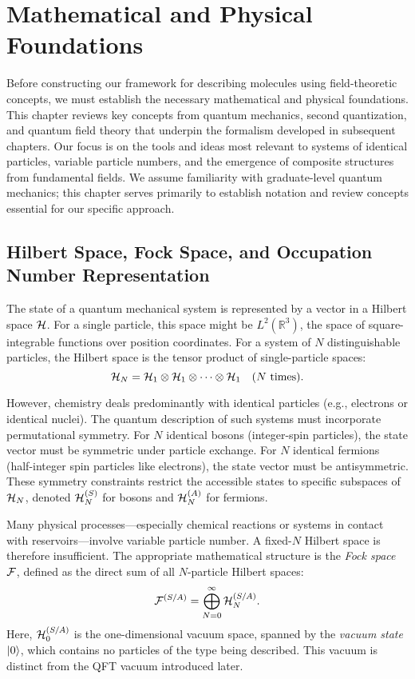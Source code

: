
\chapter{Mathematical and Physical Foundations}
\label{chap:foundations}

Before constructing our framework for describing molecules using field-theoretic concepts, we must establish the necessary mathematical and physical foundations. This chapter reviews key concepts from quantum mechanics, second quantization, and quantum field theory that underpin the formalism developed in subsequent chapters. Our focus is on the tools and ideas most relevant to systems of identical particles, variable particle numbers, and the emergence of composite structures from fundamental fields. We assume familiarity with graduate-level quantum mechanics; this chapter serves primarily to establish notation and review concepts essential for our specific approach.

\section{Hilbert Space, Fock Space, and Occupation Number Representation}
\label{sec:foundations_fock_space}

The state of a quantum mechanical system is represented by a vector in a Hilbert space \(\mathcal{H}\). For a single particle, this space might be \(L^2(\mathbb{R}^3)\), the space of square-integrable functions over position coordinates. For a system of \(N\) distinguishable particles, the Hilbert space is the tensor product of single-particle spaces:
\[
\mathcal{H}_N = \mathcal{H}_1 \otimes \mathcal{H}_1 \otimes \dots \otimes \mathcal{H}_1 \quad \text{(\(N\) times)}.
\]

However, chemistry deals predominantly with identical particles (e.g., electrons or identical nuclei). The quantum description of such systems must incorporate permutational symmetry. For \(N\) identical bosons (integer-spin particles), the state vector must be symmetric under particle exchange. For \(N\) identical fermions (half-integer spin particles like electrons), the state vector must be antisymmetric. These symmetry constraints restrict the accessible states to specific subspaces of \(\mathcal{H}_N\), denoted \(\mathcal{H}_N^{(S)}\) for bosons and \(\mathcal{H}_N^{(A)}\) for fermions.

Many physical processes—especially chemical reactions or systems in contact with reservoirs—involve variable particle number. A fixed-\(N\) Hilbert space is therefore insufficient. The appropriate mathematical structure is the \emph{Fock space} \(\mathcal{F}\), defined as the direct sum of all \(N\)-particle Hilbert spaces:
\begin{equation}
	\mathcal{F}^{(S/A)} = \bigoplus_{N=0}^{\infty} \mathcal{H}_N^{(S/A)}.
	\label{eq:fock_space_def}
\end{equation}
Here, \(\mathcal{H}_0^{(S/A)}\) is the one-dimensional vacuum space, spanned by the \emph{vacuum state} \(\ket{0}\), which contains no particles of the type being described. This vacuum is distinct from the QFT vacuum introduced later.

